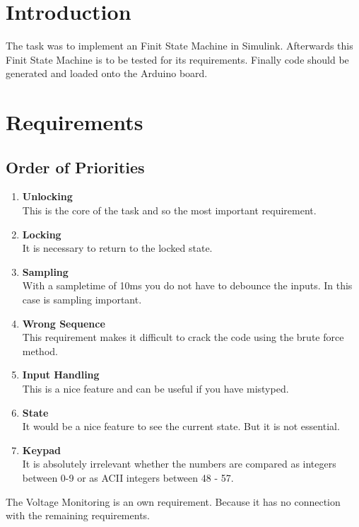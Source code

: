 \section*{Introduction}
The task was to implement an Finit State Machine in Simulink.
Afterwards this Finit State Machine is to be tested for its requirements.
Finally code should be generated and loaded onto the Arduino board. 

\section{Requirements}

	\subsection{Order of Priorities}
		
		\begin{enumerate}
			\item \textbf{Unlocking}\\
				This is the core of the task and so the most important requirement.
			\item \textbf{Locking}\\
				It is necessary to return to the locked state.
			\item \textbf{Sampling}\\
				With a sampletime of 10ms you do not have to debounce the inputs. In this case is sampling important.							
			\item \textbf{Wrong Sequence}\\
				This requirement makes it difficult to crack the code using the brute force method.
			\item \textbf{Input Handling}\\
				This is a nice feature and can be useful if you have mistyped.
			\item \textbf{State}\\
				It would be a nice feature to see the current state. But it is not essential.		
			\item \textbf{Keypad}\\
				It is absolutely irrelevant whether the numbers are compared as integers between 0-9 or as ACII integers between 48 - 57.
		\end{enumerate}	
The Voltage Monitoring is an own requirement. Because it has no connection with the remaining requirements.
	

